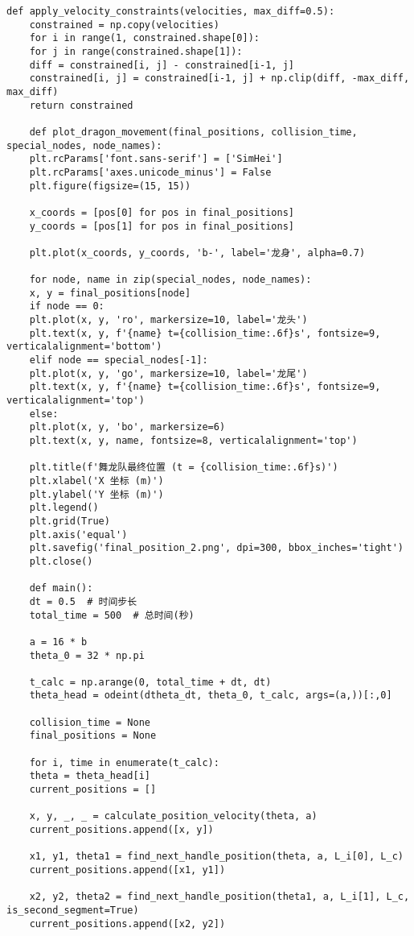 \begin{lstlisting}[caption={问题二处理代码1}]
	def apply_velocity_constraints(velocities, max_diff=0.5):
	constrained = np.copy(velocities)
	for i in range(1, constrained.shape[0]):
	for j in range(constrained.shape[1]):
	diff = constrained[i, j] - constrained[i-1, j]
	constrained[i, j] = constrained[i-1, j] + np.clip(diff, -max_diff, max_diff)
	return constrained
	
	def plot_dragon_movement(final_positions, collision_time, special_nodes, node_names):
	plt.rcParams['font.sans-serif'] = ['SimHei']
	plt.rcParams['axes.unicode_minus'] = False
	plt.figure(figsize=(15, 15))
	
	x_coords = [pos[0] for pos in final_positions]
	y_coords = [pos[1] for pos in final_positions]
	
	plt.plot(x_coords, y_coords, 'b-', label='龙身', alpha=0.7)
	
	for node, name in zip(special_nodes, node_names):
	x, y = final_positions[node]
	if node == 0:
	plt.plot(x, y, 'ro', markersize=10, label='龙头')
	plt.text(x, y, f'{name} t={collision_time:.6f}s', fontsize=9, verticalalignment='bottom')
	elif node == special_nodes[-1]:
	plt.plot(x, y, 'go', markersize=10, label='龙尾')
	plt.text(x, y, f'{name} t={collision_time:.6f}s', fontsize=9, verticalalignment='top')
	else:
	plt.plot(x, y, 'bo', markersize=6)
	plt.text(x, y, name, fontsize=8, verticalalignment='top')
	
	plt.title(f'舞龙队最终位置 (t = {collision_time:.6f}s)')
	plt.xlabel('X 坐标 (m)')
	plt.ylabel('Y 坐标 (m)')
	plt.legend()
	plt.grid(True)
	plt.axis('equal')
	plt.savefig('final_position_2.png', dpi=300, bbox_inches='tight')
	plt.close()
	
	def main():
	dt = 0.5  # 时间步长
	total_time = 500  # 总时间(秒)
	
	a = 16 * b
	theta_0 = 32 * np.pi
	
	t_calc = np.arange(0, total_time + dt, dt)
	theta_head = odeint(dtheta_dt, theta_0, t_calc, args=(a,))[:,0]
	
	collision_time = None
	final_positions = None
	
	for i, time in enumerate(t_calc):
	theta = theta_head[i]
	current_positions = []
	
	x, y, _, _ = calculate_position_velocity(theta, a)
	current_positions.append([x, y])
	
	x1, y1, theta1 = find_next_handle_position(theta, a, L_i[0], L_c)
	current_positions.append([x1, y1])
	
	x2, y2, theta2 = find_next_handle_position(theta1, a, L_i[1], L_c, is_second_segment=True)
	current_positions.append([x2, y2])
	

\end{lstlisting}
